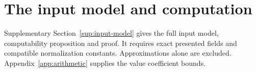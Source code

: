 \section{The input model and computation}\label{app:algorithm}
Supplementary Section~\ref{sup:input-model} gives the full input
model, computability proposition and proof.
It requires exact presented fields and compatible normalization constants.
Approximations alone are excluded.
Appendix~\ref{app:arithmetic} supplies the value coefficient bounds.
